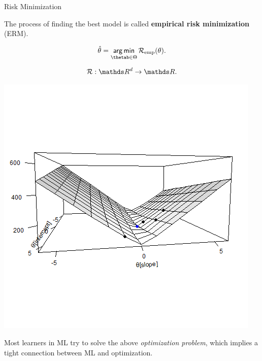 \documentclass[11pt,compress,t,notes=noshow, xcolor=table]{beamer}
\begin{document}
\begin{vbframe}{Risk Minimization}


The process of finding the best model is called \textbf{empirical risk minimization} (ERM).

$$
\thetah = \argmin_{\thetab \in \Theta} \risket.
$$

\begin{table}
\begin{minipage}{0.4\linewidth}
$$\risk : \R^d \to \R.$$
\end{minipage}\hfill
	\begin{minipage}{0.55\linewidth}
\includegraphics[width=\textwidth]{figure/ml-basic-riskmin-error-surface-best.png}
\end{minipage}
\end{table}

Most learners in ML try to solve the above \emph{optimization problem}, which implies a tight connection between ML and optimization.

\end{vbframe}
\end{document}
